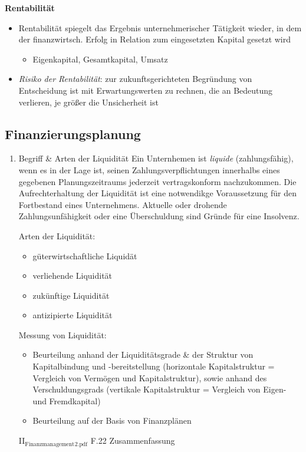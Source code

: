 \documentclass[11pt]{article}
\begin{document}
\begin{enumerate}
\textbf{Rentabilität}
\begin{itemize}
\item Rentabilität spiegelt das Ergebnis unternehmerischer Tätigkeit wieder, in dem der finanzwirtsch. Erfolg in Relation zum eingesetzten Kapital gesetzt wird 
\begin{itemize}
\item Eigenkapital, Gesamtkapital, Umsatz
\end{itemize}
\item \emph{Risiko der Rentabilität}: zur zukunftsgerichteten Begründung von Entscheidung ist mit Erwartungswerten zu rechnen, die an Bedeutung verlieren, je größer die Unsicherheit ist
\end{itemize}
\end{enumerate}

\subsection{Finanzierungsplanung}
\label{sec:orgb89b2b0}
\begin{enumerate}
\item Begriff \& Arten der Liquidität
\label{sec:orga9aa41c}
Ein Unternhemen ist \emph{liquide} (zahlungsfähig), wenn es in der Lage ist, seinen Zahlungsverpflichtungen innerhalbs eines gegebenen Planungszeitraums jederzeit vertragskonform nachzukommen. Die Aufrechterhaltung der Liquidität ist eine notwendikge Voraussetzung für den Fortbestand eines Unternehmens. Aktuelle oder drohende Zahlungsunfähigkeit oder eine Überschuldung sind Gründe für eine Insolvenz.

Arten der Liquidität:
\begin{itemize}
\item güterwirtschaftliche Liquidät
\item verliehende Liquidität
\item zukünftige Liquidität
\item antizipierte Liquidität
\end{itemize}

Messung von Liquidität:
\begin{itemize}
\item Beurteilung anhand der Liquiditätsgrade \& der Struktur von Kapitalbindung und -bereitstellung (horizontale Kapitalstruktur = Vergleich von Vermögen und Kapitalstruktur), sowie anhand des Verschuldungsgrads (vertikale Kapitalstruktur = Vergleich von Eigen- und Fremdkapital)
\item Beurteilung auf der Basis von Finanzplänen
\end{itemize}

II\(_{\text{Finanzmanagement}}\)\(_{\text{2.pdf}}\) F.22 Zusammenfassung
\end{enumerate}
\end{document}
